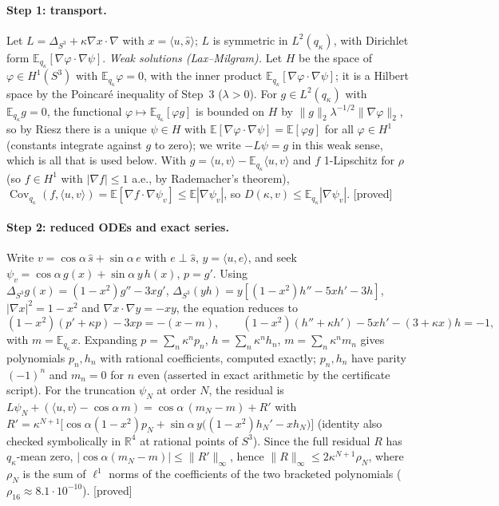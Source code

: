 \documentclass[11pt,a4paper]{article}
\theoremstyle{remark}
\theoremstyle{definition}
\theoremstyle{plain}
\theoremstyle{remark}
\newcommand{\R}{\mathbb{R}}
\newcommand{\E}{\mathbb{E}}
\newcommand{\Cov}{\operatorname{Cov}}
\newcommand{\st}[1]{\textsf{[#1]}}
\begin{document}
\paragraph{Step 1: transport.} Let $L=\Delta_{S^3}+\kappa\nabla x\cdot\nabla$ with $x=\langle u,\hat s\rangle$;
$L$ is symmetric in $L^2(q_\kappa)$, with Dirichlet form $\E_{q_\kappa}[\nabla\varphi\cdot\nabla\psi]$.
\emph{Weak solutions (Lax--Milgram).} Let $H$ be the space of $\varphi\in H^1(S^3)$ with $\E_{q_\kappa}\varphi=0$,
with the inner product $\E_{q_\kappa}[\nabla\varphi\cdot\nabla\psi]$; it is a Hilbert space by the Poincar\'e
inequality of Step~3 ($\lambda>0$). For $g\in L^2(q_\kappa)$ with $\E_{q_\kappa}g=0$, the functional
$\varphi\mapsto\E_{q_\kappa}[\varphi g]$ is bounded on $H$ by $\|g\|_2\lambda^{-1/2}\|\nabla\varphi\|_2$, so by
Riesz there is a unique $\psi\in H$ with $\E[\nabla\varphi\cdot\nabla\psi]=\E[\varphi g]$ for all
$\varphi\in H^1$ (constants integrate against $g$ to zero); we write $-L\psi=g$ in this weak sense, which is
all that is used below. With $g=\langle u,v\rangle-\E_{q_\kappa}\langle u,v\rangle$ and $f$ 1-Lipschitz for
$\rho$ (so $f\in H^1$ with $|\nabla f|\le1$ a.e., by Rademacher's theorem),
$\Cov_{q_\kappa}(f,\langle u,v\rangle)=\E[\nabla f\cdot\nabla\psi_v]\le\E|\nabla\psi_v|$, so
$D(\kappa,v)\le\E_{q_\kappa}|\nabla\psi_v|$. \st{proved}

\paragraph{Step 2: reduced ODEs and exact series.} Write $v=\cos\alpha\,\hat s+\sin\alpha\,e$ with
$e\perp\hat s$, $y=\langle u,e\rangle$, and seek $\psi_v=\cos\alpha\,g(x)+\sin\alpha\,y\,h(x)$, $p=g'$.
Using $\Delta_{S^3}g(x)=(1-x^2)g''-3xg'$, $\Delta_{S^3}(yh)=y[(1-x^2)h''-5xh'-3h]$,
$|\nabla x|^2=1-x^2$ and $\nabla x\cdot\nabla y=-xy$, the equation reduces to
\[
(1-x^2)(p'+\kappa p)-3xp=-(x-m),\qquad (1-x^2)(h''+\kappa h')-5xh'-(3+\kappa x)h=-1,
\]
with $m=\E_{q_\kappa}x$. Expanding $p=\sum_n\kappa^np_n$, $h=\sum_n\kappa^nh_n$, $m=\sum_n\kappa^nm_n$ gives
polynomials $p_n,h_n$ with rational coefficients, computed exactly; $p_n,h_n$ have parity $(-1)^n$ and
$m_n=0$ for $n$ even (asserted in exact arithmetic by the certificate script).
For the truncation $\psi_N$ at order $N$, the residual is
$L\psi_N+(\langle u,v\rangle-\cos\alpha\,m)=\cos\alpha\,(m_N-m)+R'$ with
$R'=\kappa^{N+1}\big[\cos\alpha(1-x^2)p_N+\sin\alpha\,y\big((1-x^2)h_N'-xh_N\big)\big]$
(identity also checked symbolically in $\R^4$ at rational points of $S^3$).
Since the full residual $R$ has $q_\kappa$-mean zero, $|\cos\alpha(m_N-m)|\le\|R'\|_\infty$, hence
$\|R\|_\infty\le2\kappa^{N+1}\rho_N$, where $\rho_N$ is the sum of $\ell^1$ norms of the coefficients of the
two bracketed polynomials ($\rho_{16}\approx8.1\cdot10^{-10}$). \st{proved}
\end{document}
